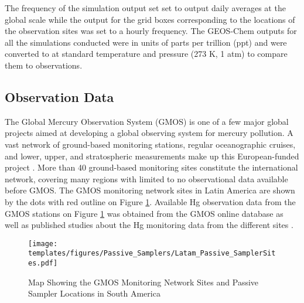 \begin{table}[H]
\label{tab:geos_chem_simulation_description}

\centering
{}

\end{table}

\begin{flushleft}

 The frequency of the simulation output set set to output daily \hg averages at the global scale while the \hg output for the grid boxes corresponding to the locations of the observation sites was set to a hourly frequency. The GEOS-Chem outputs for all the simulations conducted were in units of parts per trillion (ppt) and were converted to \nang at standard temperature and pressure (273 K, 1 atm) to compare them to observations.
\end{flushleft}

\subsection{Observation Data}

\begin{flushleft}
 The Global Mercury Observation System (GMOS) is one of a few major global projects aimed at developing a global observing system for mercury pollution. A vast network of ground-based monitoring stations, regular oceanographic cruises, and lower, upper, and stratospheric measurements make up this European-funded project \cite{sprovieri_atmospheric_2016} \cite{koenig_seasonal_2021}. More than 40 ground-based monitoring sites constitute the international network, covering many regions with limited to no observational data available before GMOS. The GMOS monitoring network sites in Latin America are shown by the dots with red outline on Figure \ref{fig:GMOS_PAS_stations_map}. Available Hg observation data from the GMOS stations on Figure  \ref{fig:GMOS_PAS_stations_map} was obtained from the GMOS online database as well as published studies about the Hg monitoring data from the different sites \cite{koenig_seasonal_2021}.  
\end{flushleft}
\begin{figure}[H]
  \texttt{[image: templates/figures/Passive\_Samplers/Latam\_Passive\_SamplerSites.pdf]}
  \caption{Map Showing the GMOS Monitoring Network Sites and Passive Sampler Locations in South America}
  \label{fig:GMOS_PAS_stations_map}
  \centering
  
\end{figure}
\FloatBarrier

